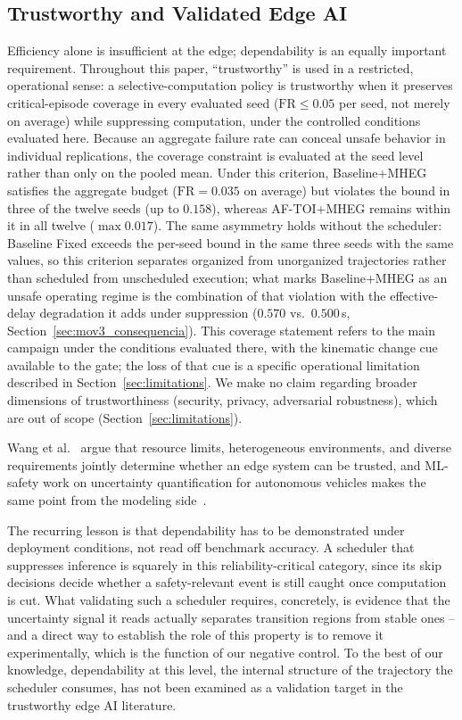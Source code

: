 \documentclass[a4paper,fleqn]{cas-dc}
\begin{document}
\subsection{Trustworthy and Validated Edge AI}
\label{sec:rel_trust}
Efficiency alone is insufficient at the edge; dependability is an equally important requirement.
{\color{\revcolor}Throughout this paper, ``trustworthy'' is used in a restricted,
operational sense: a selective-computation policy is trustworthy when it
preserves critical-episode coverage in every evaluated seed
($\mathrm{FR} \le 0.05$ per seed, not merely on average) while suppressing
computation, under the controlled conditions evaluated here. Because an
aggregate failure rate can conceal unsafe behavior in individual
replications, the coverage constraint is evaluated at the seed level rather
than only on the pooled mean. Under this criterion, Baseline+MHEG satisfies
the aggregate budget ($\mathrm{FR}=0.035$ on average) but violates the bound
in three of the twelve seeds (up to $0.158$), whereas \mbox{AF-TOI}+MHEG
remains within it in all twelve ($\max 0.017$). The same asymmetry holds
without the scheduler: Baseline Fixed exceeds the per-seed bound in the same
three seeds with the same values, so this criterion separates organized from
unorganized trajectories rather than scheduled from unscheduled execution;
what marks Baseline+MHEG as an unsafe operating regime is the combination of
that violation with the effective-delay degradation it adds under suppression
($0.570$ vs.\ $0.500$\,s, Section~\ref{sec:mov3_consequencia}). This coverage statement refers
to the main campaign under the conditions evaluated there, with the kinematic
change cue available to the gate; the loss of that cue is a specific
operational limitation described in Section~\ref{sec:limitations}. We make no claim
regarding broader dimensions of trustworthiness (security, privacy, adversarial
robustness), which are out of scope (Section~\ref{sec:limitations}).}

Wang et al.~\cite{wang2025trustworthy} argue that resource limits, heterogeneous
environments, and diverse requirements jointly determine whether an edge system can
be trusted, and ML-safety work on uncertainty quantification for autonomous vehicles
makes the same point from the modeling side~\cite{mcallister2017concrete,mohseni2020mlsafety,hendrycks2022mlsafety}.

The recurring lesson is that dependability has to be demonstrated under deployment
conditions, not read off benchmark accuracy. A scheduler that suppresses inference
is squarely in this reliability-critical category, since its skip decisions decide
whether a safety-relevant event is still caught once computation is cut. What
validating such a scheduler requires, concretely, is evidence that the uncertainty
signal it reads actually separates transition regions from stable ones -- and a direct way to establish the role of this property is to remove it experimentally, which is the function of our negative control. To the best of our knowledge, dependability at this level, the
internal structure of the trajectory the scheduler consumes, has not been examined
as a validation target in the trustworthy edge AI literature.
\end{document}
